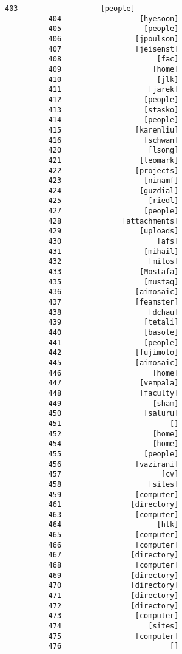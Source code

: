 \documentclass[11pt]{article}
\begin{document}
\begin{Verbatim}[commandchars=\\\{\}]
          403                   [people]
          404                  [hyesoon]
          405                   [people]
          406                 [jpoulson]
          407                 [jeisenst]
          408                      [fac]
          409                     [home]
          410                      [jlk]
          411                    [jarek]
          412                   [people]
          413                   [stasko]
          414                   [people]
          415                 [karenliu]
          416                   [schwan]
          420                    [lsong]
          421                  [leomark]
          422                 [projects]
          423                   [ninamf]
          424                  [guzdial]
          425                    [riedl]
          427                   [people]
          428              [attachments]
          429                  [uploads]
          430                      [afs]
          431                   [mihail]
          432                    [milos]
          433                  [Mostafa]
          435                   [mustaq]
          436                 [aimosaic]
          437                 [feamster]
          438                    [dchau]
          439                   [tetali]
          440                   [basole]
          441                   [people]
          442                 [fujimoto]
          445                 [aimosaic]
          446                     [home]
          447                  [vempala]
          448                  [faculty]
          449                     [sham]
          450                   [saluru]
          451                         []
          452                     [home]
          454                     [home]
          455                   [people]
          456                 [vazirani]
          457                       [cv]
          458                    [sites]
          459                 [computer]
          461                [directory]
          463                 [computer]
          464                      [htk]
          465                 [computer]
          466                 [computer]
          467                [directory]
          468                 [computer]
          469                [directory]
          470                [directory]
          471                [directory]
          472                [directory]
          473                 [computer]
          474                    [sites]
          475                 [computer]
          476                         []

\end{Verbatim}
\end{document}
